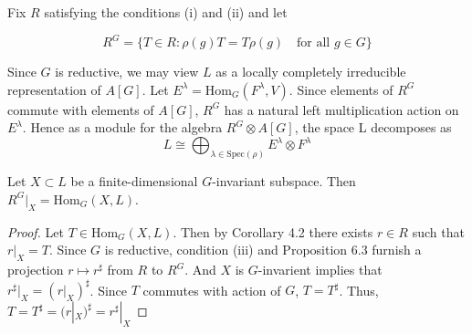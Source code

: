 \documentclass[12pt]{article}
\newenvironment{lemma}[2][Lemma]{\begin{trivlist}
\item[\hskip \labelsep {\bfseries #1}\hskip \labelsep {\bfseries #2.}]}{\end{trivlist}}
\begin{document}
    Fix $R$ satisfying the conditions (i) and (ii) and let
    
    $$
    R^G = \{ T \in R : \rho(g)T = T\rho(g) \quad \text{for all } g \in G \}
    $$
    
    Since $G$ is reductive, we may view $L$ as a locally completely irreducible representation of $A[G]$. Let $E^{\lambda}=\mathrm{Hom}_{G}(F^{\lambda},V)$. Since elements of $R^G$ commute with elements of $A[G]$, $R^G$ has a natural left multiplication action on $E^\lambda$. Hence as a module for the algebra $R^G \otimes A[G]$, the space L decomposes as $$L\cong \bigoplus_{\lambda \in \mathrm{Spec}(\rho)}E^{\lambda}\otimes F^{\lambda}$$
    
    \begin{lemma}{7.1}
    Let $X \subset L$ be a finite-dimensional $G$-invariant subspace. Then $R^G|_X = \mathrm{Hom}_G(X, L)$.
    \end{lemma}
    
    \begin{proof}
    Let $T \in \mathrm{Hom}_G(X, L)$. Then by Corollary 4.2 there exists $r \in R$ such that $r|_X = T$. Since $G$ is reductive, condition (iii) and Proposition 6.3 furnish a projection $r \mapsto r^\sharp$ from $R$ to $R^G$. And $X$ is $G$-invarient implies that $r^\sharp|_X = (r|_X)^{\sharp}$. Since $T$ commutes with action of $G$, $T=T^{\sharp}$. Thus, $T=T^{\sharp}=(r|_X)^{\sharp}=r^{\sharp}|_X$
    \end{proof}
    
\end{document}

